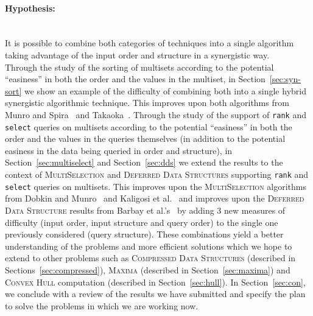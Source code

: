 
\paragraph{Hypothesis:}~\\ It is possible to combine both categories of
techniques into a single algorithm taking advantage of the input order
and structure in a synergistic way.~\\


Through the study of the sorting of multisets according to the
potential ``easiness'' in both the order and the values in the
multiset, in Section~\ref{sec:syn-sort} we show an example of the
difficulty of combining both into a single hybrid synergistic algorithmic
technique. 
This improves upon both algorithms from Munro and
Spira~\cite{1976-JComp-SortingAndSearchingInMultisets-MunroSpira} and
Takaoka~\cite{2009-Chapter-PartialSolutionAndEntropy-Takaoka}.
%
Through the study of the support of \texttt{rank} and \texttt{select}
queries on multisets according to the potential ``easiness'' in both
the order and the values in the queries themselves (in addition to the
potential easiness in the data being queried in order and structure),
in Section~\ref{sec:multiselect} and Section~\ref{sec:dds} we extend
the results to the context of \textsc{MultiSelection} and
\textsc{Deferred Data Structures} supporting \texttt{rank} and
\texttt{select} queries on multisets. This improves upon the
\textsc{MultiSelection} algorithms from Dobkin and
Munro~\cite{1981-JACM-OptimalTimeMinimalSpaceSelectionAlgorithms-DobkinMunro}
and Kaligosi et
al.~\cite{2005-ICALP-TowardsOptimalMultopleSelection-KaligosiMehlhornMunroSanders}
and improves upon the \textsc{Deferred Data Structure} results from
Barbay et
al.'s~\cite{2016-JDA-NearOptimalOnlineMultiselectionInInternalAndExternalMemory-BarbayGuptaRaoSorenson}
by adding 3 new measures of difficulty (input order, input structure
and query order) to the single one previously considered (query
structure). These combinations yield a better understanding of the
problems and more efficient solutions which we hope to extend to other
problems such as \textsc{Compressed Data Structures} (described in
Sections~\ref{sec:compressed}), \textsc{Maxima} (described in
Section~\ref{sec:maxima}) and \textsc{Convex Hull} computation
(described in Section~\ref{sec:hull}). In Section~\ref{sec:con}, we
conclude with a review of the results we have submitted and specify
the plan to solve the problems in which we are working now.

